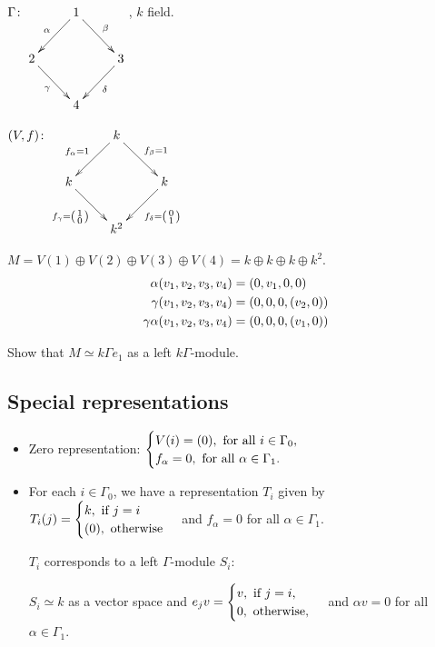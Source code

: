 \begin{exam}
$\Gamma\colon \xymatrix{ & 1\ar[dl]_\alpha\ar[dr]^\beta & \\
2\ar[dr]_\gamma & & 3\ar[dl]^\delta\\
& 4 & }$, $k$ field.

$(V,f)\colon \xymatrix{ & k\ar[dl]_{f_\alpha = 1}\ar[dr]^{f_\beta=1} & \\
k\ar[dr]_{f_\gamma=\left(\begin{smallmatrix} 1\\ 0\end{smallmatrix}\right)} & & k\ar[dl]^{f_\delta=\left(\begin{smallmatrix} 0\\ 1\end{smallmatrix}\right)}\\
& k^2 & }$

$M = V(1) \oplus V(2) \oplus V(3) \oplus V(4) = k\oplus k\oplus
k\oplus k^2$.
\begin{align}
\alpha (v_1,v_2,v_3,v_4)  & = (0, v_1, 0, 0 )\notag\\
\gamma (v_1,v_2,v_3,v_4)  & = (0, 0, 0, (v_2, 0) )\notag\\
\gamma\alpha (v_1,v_2,v_3,v_4)  & = (0, 0, 0, (v_1, 0) )\notag
\end{align}
\end{exam}

\begin{exer} Show that $M\simeq k\Gamma e_1$ as a left
  $k\Gamma$-module.
\end{exer}

\subsection{Special representations}
\begin{itemize}
\item Zero representation:  
$\begin{cases} 
V(i) = (0), \text{\ for all $i\in\Gamma_0$},\notag\\
f_\alpha = 0, \text{\ for all $\alpha\in \Gamma_1$}.\notag
\end{cases}$
\item For each $i\in\Gamma_0$, we have a representation $T_i$ given by
$T_i(j) = \begin{cases} k, \text{\ if $j = i$}\notag\\
(0), \text{\ otherwise}\notag
\end{cases}$
and $f_\alpha = 0$ for all $\alpha\in \Gamma_1$. 

$T_i$ corresponds to a left $\Gamma$-module $S_i$:

$S_i\simeq k$ as a vector space and $e_j v = \begin{cases} v, \text{\
    if $j = i$},\notag\\ 0, \text{\ otherwise},\notag\end{cases}$ and
$\alpha v = 0$ for all $\alpha\in \Gamma_1$. 
\end{itemize}

